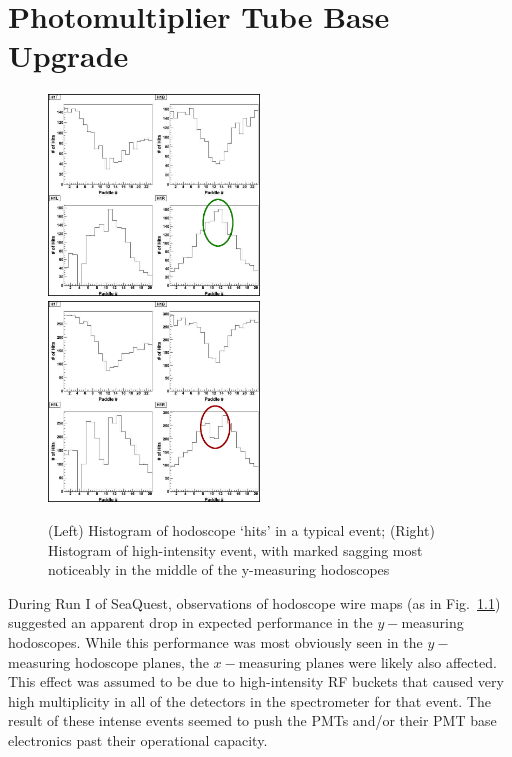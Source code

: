 \chapter{Photomultiplier Tube Base Upgrade}

\begin{figure}
	\centerline{
		\mbox{\includegraphics[width=0.5\textwidth]{figures/nosag.jpg} \includegraphics[width=0.5\textwidth]{figures/sag.jpg}}
	}
	\caption{(Left) Histogram of hodoscope `hits' in a typical event; (Right) Histogram of high-intensity event, with marked sagging most noticeably in the middle of the y-measuring hodoscopes}
	\label{fig:sag}
\end{figure}

During Run I of SeaQuest, observations of hodoscope wire maps (as in Fig.~\ref{fig:sag}) suggested an apparent drop in expected performance in the $y-$measuring hodoscopes. While this performance was most obviously seen in the $y-$measuring hodoscope planes, the $x-$measuring planes were likely also affected. This effect was assumed to be due to high-intensity RF buckets that caused very high multiplicity in all of the detectors in the spectrometer for that event. The result of these intense events seemed to push the PMTs and/or their PMT base electronics past their operational capacity.

